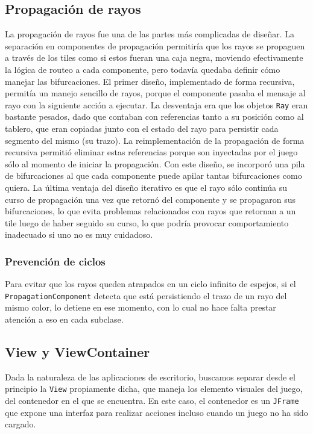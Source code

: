 \documentclass[a4paper, 11pt]{article}
\begin{document}
	\subsection{Propagación de rayos}
	La propagación de rayos fue una de las partes más complicadas de diseñar. La separación en componentes de propagación permitiría que los rayos se propaguen a través de los tiles como si estos fueran una caja negra, moviendo efectivamente la lógica de routeo a cada componente, pero todavía quedaba definir cómo manejar las bifurcaciones. El primer diseño, implementado de forma recursiva, permitía un manejo sencillo de rayos, porque el componente pasaba el mensaje al rayo con la siguiente acción a ejecutar. La desventaja era que los objetos \texttt{Ray} eran bastante pesados, dado que contaban con referencias tanto a su posición como al tablero, que eran copiadas junto con el estado del rayo para persistir cada segmento del mismo (su trazo). La reimplementación de la propagación de forma recursiva permitió eliminar estas referencias porque son inyectadas por el juego sólo al momento de iniciar la propagación. Con este diseño, se incorporó una pila de bifurcaciones al que cada componente puede apilar tantas bifurcaciones como quiera. La última ventaja del diseño iterativo es que el rayo sólo continúa su curso de propagación una vez que retornó del componente y se propagaron sus bifurcaciones, lo que evita problemas relacionados con rayos que retornan a un tile luego de haber seguido su curso, lo que podría provocar comportamiento inadecuado si uno no es muy cuidadoso.

	\subsubsection{Prevención de ciclos}
	Para evitar que los rayos queden atrapados en un ciclo infinito de espejos, si el \texttt{PropagationComponent} detecta que está persistiendo el trazo de un rayo del mismo color, lo detiene en ese momento, con lo cual no hace falta prestar atención a eso en cada subclase.

	\subsection{View y ViewContainer}
	Dada la naturaleza de las aplicaciones de escritorio, buscamos separar desde el principio la \texttt{View} propiamente dicha, que maneja los elemento visuales del juego, del contenedor en el que se encuentra. En este caso, el contenedor es un \texttt{JFrame} que expone una interfaz para realizar acciones incluso cuando un juego no ha sido cargado.
\end{document}
